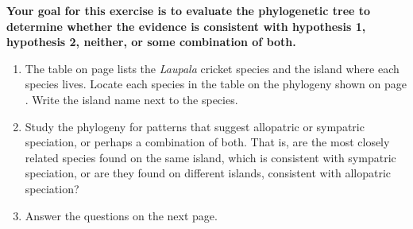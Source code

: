 \documentclass[11pt, addpoints]{exam}
\begin{document}
\textbf{Your goal for this exercise is to evaluate the phylogenetic tree
to determine whether the evidence is consistent with hypothesis 1,
hypothesis 2, neither, or some combination of both.}

\begin{enumerate}
\item The table on page \pageref{tab:cricket_table} lists the \textit{Laupala} cricket species and the island where each species lives. Locate each species in the table on the phylogeny shown on page \pageref{fig:cricket_phylogeny}. Write the island name next to the species.

\item Study the phylogeny for patterns that suggest allopatric or
sympatric speciation, or perhaps a combination of both. That is, are the most closely related species found on the same island, which is consistent with sympatric speciation, or are they found on different islands, consistent with allopatric speciation?

\item Answer the questions on the next page.

\end{enumerate}

\newpage
\end{document}
